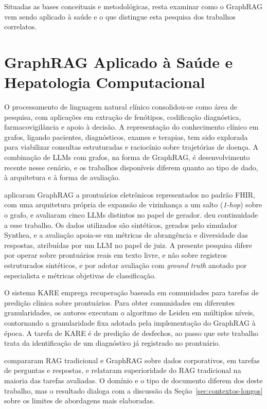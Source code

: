 Situadas as bases conceituais e metodológicas, resta examinar como o GraphRAG vem sendo aplicado à saúde e o que distingue esta pesquisa dos trabalhos correlatos.

\section{GraphRAG Aplicado à Saúde e Hepatologia Computacional}\label{sec:correlatos}

O processamento de linguagem natural clínico consolidou-se como área de pesquisa, com aplicações em extração de fenótipos, codificação diagnóstica, farmacovigilância e apoio à decisão. A representação do conhecimento clínico em grafos, ligando pacientes, diagnósticos, exames e terapias, tem sido explorada para viabilizar consultas estruturadas e raciocínio sobre trajetórias de doença. A combinação de LLMs com grafos, na forma de GraphRAG, é desenvolvimento recente nesse cenário, e os trabalhos disponíveis diferem quanto ao tipo de dado, à arquitetura e à forma de avaliação.

\citet{baptista2025} aplicaram GraphRAG a prontuários eletrônicos representados no padrão FHIR, com uma arquitetura própria de expansão de vizinhança a um salto (\textit{1-hop}) sobre o grafo, e avaliaram cinco LLMs distintos no papel de gerador. \citet{baptista2026} deu continuidade a esse trabalho. Os dados utilizados são sintéticos, gerados pelo simulador Synthea, e a avaliação apoia-se em métricas de abrangência e diversidade das respostas, atribuídas por um LLM no papel de juiz. A presente pesquisa difere por operar sobre prontuários reais em texto livre, e não sobre registros estruturados sintéticos, e por adotar avaliação com \textit{ground truth} anotado por especialista e métricas objetivas de classificação.

O sistema KARE \citep{kare2025} emprega recuperação baseada em comunidades para tarefas de predição clínica sobre prontuários. Para obter comunidades em diferentes granularidades, os autores executam o algoritmo de Leiden em múltiplos níveis, contornando a granularidade fixa adotada pela implementação do GraphRAG à época. A tarefa de KARE é de predição de desfechos, ao passo que este trabalho trata da identificação de um diagnóstico já registrado no prontuário.

\citet{rakuljic2026} compararam RAG tradicional e GraphRAG sobre dados corporativos, em tarefas de perguntas e respostas, e relataram superioridade do RAG tradicional na maioria das tarefas avaliadas. O domínio e o tipo de documento diferem dos deste trabalho, mas o resultado dialoga com a discussão da Seção~\ref{sec:contextos-longos} sobre os limites de abordagens mais elaboradas.

